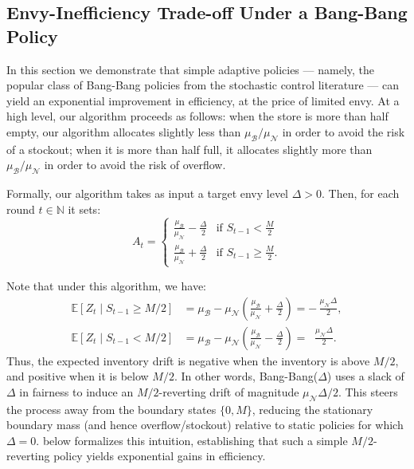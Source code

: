 \documentclass[mnsc,nonblindrev]{informs3}
\newcommand{\N}{\mathbb{N}}
\newcommand{\NDist}{\mathcal{N}}
\newcommand{\BDist}{\mathcal{B}}
\newcommand{\ALG}{{Bang-Bang}\xspace}
\begin{document}
\subsection{Envy-Inefficiency Trade-off Under a Bang-Bang Policy} 
\label{ssec:Bang-Bang_Policy} 

In this section we demonstrate that simple adaptive policies --- namely, the popular class of \ALG policies from the stochastic control literature \citep{scokaert2002constrained,cerf1995bang} --- can yield an exponential improvement in efficiency, at the price of limited envy. At a high level, our algorithm proceeds as follows: when the store is more than half empty, our algorithm allocates slightly less than $\mu_{\BDist}/\mu_{\NDist}$ in order to avoid the risk of a stockout; when it is more than half full, it allocates slightly more than $\mu_{\BDist}/\mu_{\NDist}$ in order to avoid the risk of overflow.

Formally, our algorithm takes as input a target envy level $\Delta > 0$. Then, for each round $t\in\N$ it sets:
\begin{equation}
\label{eq:bang_bang_pt_2}
A_t = \begin{cases}
\frac{\mu_{\mathcal{B}}}{\mu_{\mathcal{N}}} - \frac{\Delta}{2} &\text{if } S_{t-1} < \frac{M}{2} \\
\frac{\mu_{\mathcal{B}}}{\mu_{\mathcal{N}}} + \frac{\Delta}{2} &\text{if } S_{t-1} \geq \frac{M}{2}.
\end{cases}
\end{equation}

Note that under this algorithm, we have:
\[
\begin{aligned}
\mathbb{E}[Z_t \mid S_{t-1} \ge M/2] 
&= \mu_{\mathcal{B}} - \mu_{\mathcal{N}}\!\left(\frac{\mu_{\mathcal{B}}}{\mu_{\mathcal{N}}} + \frac{\Delta}{2}\right)
= -\,\frac{\mu_{\mathcal{N}} \Delta}{2}, \\[4pt]
\mathbb{E}[Z_t \mid S_{t-1} < M/2] 
&= \mu_{\mathcal{B}} - \mu_{\mathcal{N}}\!\left(\frac{\mu_{\mathcal{B}}}{\mu_{\mathcal{N}}} - \frac{\Delta}{2}\right)
= \;\;\frac{\mu_{\mathcal{N}} \Delta}{2}.
\end{aligned}
\]
Thus, the expected inventory drift is negative when the inventory is above $M/2$, and positive when it is below $M/2$. In other words, \ALG($\Delta$) uses a slack of $\Delta$ in fairness to induce an $M/2$-reverting drift of magnitude $\mu_{\mathcal{N}} \Delta/2$. This steers the process away from the boundary states $\{0,M\}$, reducing the stationary boundary mass (and hence overflow/stockout) relative to static policies for which $\Delta = 0$.
  below formalizes this intuition, establishing that such a simple $M/2$-reverting policy yields exponential gains in efficiency.
\end{document}

